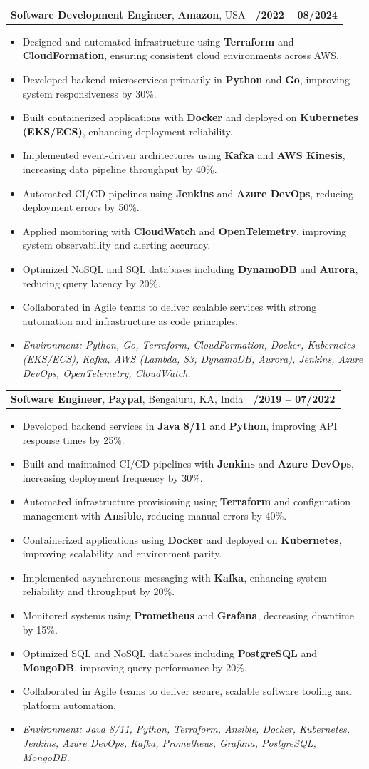 \documentclass[letterpaper,11pt]{article}
\makeatletter
\newcommand{\resumeItem}[1]{
  \item\footnotesize{
    {#1 \vspace{-2pt}}
  }
}
\newcommand{\resumeSubheading}[4]{
  \vspace{-2pt}\item
    \begin{tabular*}{1.0\textwidth}[t]{l@{\extracolsep{\fill}}r}
      \textbf{\fontsize{10pt}{14pt}\selectfont #3}, \textbf{\fontsize{10pt}{14pt}\selectfont #1}, \fontsize{10pt}{14pt}\selectfont #4 & \textbf{\fontsize{10pt}{14pt}\selectfont #2} \\
    \end{tabular*}\vspace{-7pt}
}
\newcommand{\resumeItemListStart}{\begin{itemize}[leftmargin=*]}
\newcommand{\resumeItemListEnd}{\end{itemize}\vspace{-5pt}}
\makeatother
\begin{document}
\resumeSubheading
{Amazon}{10/2022 -- 08/2024}
{Software Development Engineer}{USA}
\resumeItemListStart
  \resumeItem{Designed and automated infrastructure using \textbf{Terraform} and \textbf{CloudFormation}, ensuring consistent cloud environments across AWS.}
  \resumeItem{Developed backend microservices primarily in \textbf{Python} and \textbf{Go}, improving system responsiveness by 30\%.}
  \resumeItem{Built containerized applications with \textbf{Docker} and deployed on \textbf{Kubernetes (EKS/ECS)}, enhancing deployment reliability.}
  \resumeItem{Implemented event-driven architectures using \textbf{Kafka} and \textbf{AWS Kinesis}, increasing data pipeline throughput by 40\%.}
  \resumeItem{Automated CI/CD pipelines using \textbf{Jenkins} and \textbf{Azure DevOps}, reducing deployment errors by 50\%.}
  \resumeItem{Applied monitoring with \textbf{CloudWatch} and \textbf{OpenTelemetry}, improving system observability and alerting accuracy.}
  \resumeItem{Optimized NoSQL and SQL databases including \textbf{DynamoDB} and \textbf{Aurora}, reducing query latency by 20\%.}
  \resumeItem{Collaborated in Agile teams to deliver scalable services with strong automation and infrastructure as code principles.}
  \resumeItem{\textit{Environment: Python, Go, Terraform, CloudFormation, Docker, Kubernetes (EKS/ECS), Kafka, AWS (Lambda, S3, DynamoDB, Aurora), Jenkins, Azure DevOps, OpenTelemetry, CloudWatch.}}
\resumeItemListEnd

\resumeSubheading
{Paypal}{08/2019 -- 07/2022}
{Software Engineer}{Bengaluru, KA, India}
\resumeItemListStart
  \resumeItem{Developed backend services in \textbf{Java 8/11} and \textbf{Python}, improving API response times by 25\%.}
  \resumeItem{Built and maintained CI/CD pipelines with \textbf{Jenkins} and \textbf{Azure DevOps}, increasing deployment frequency by 30\%.}
  \resumeItem{Automated infrastructure provisioning using \textbf{Terraform} and configuration management with \textbf{Ansible}, reducing manual errors by 40\%.}
  \resumeItem{Containerized applications using \textbf{Docker} and deployed on \textbf{Kubernetes}, improving scalability and environment parity.}
  \resumeItem{Implemented asynchronous messaging with \textbf{Kafka}, enhancing system reliability and throughput by 20\%.}
  \resumeItem{Monitored systems using \textbf{Prometheus} and \textbf{Grafana}, decreasing downtime by 15\%.}
  \resumeItem{Optimized SQL and NoSQL databases including \textbf{PostgreSQL} and \textbf{MongoDB}, improving query performance by 20\%.}
  \resumeItem{Collaborated in Agile teams to deliver secure, scalable software tooling and platform automation.}
  \resumeItem{\textit{Environment: Java 8/11, Python, Terraform, Ansible, Docker, Kubernetes, Jenkins, Azure DevOps, Kafka, Prometheus, Grafana, PostgreSQL, MongoDB.}}
\resumeItemListEnd
\end{document}
